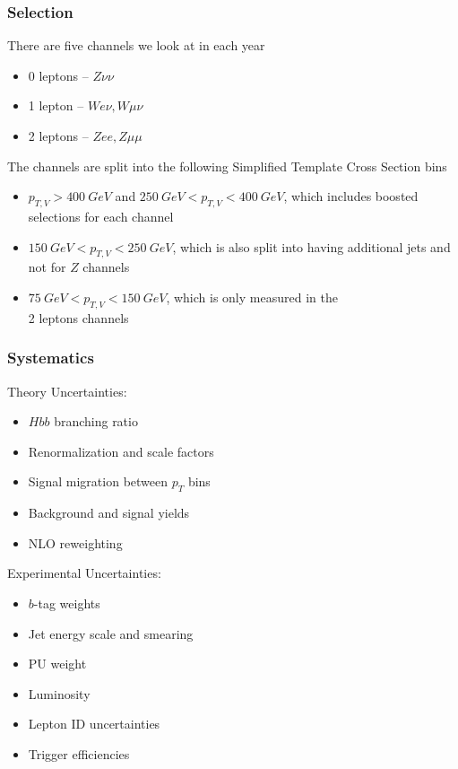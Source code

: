 \documentclass{beamer}
\begin{document}
\begin{frame}
  \frametitle{Selection}

  There are five channels we look at in each year
  \begin{itemize}
  \item 0 leptons -- $Z\nu\nu$
  \item 1 lepton -- $We\nu, W\mu\nu$
  \item 2 leptons -- $Zee, Z\mu\mu$
  \end{itemize}
  The channels are split into the following Simplified Template Cross Section bins
  \begin{itemize}
  \item $p_{T,V} > \SI{400}{GeV}$ and $\SI{250}{GeV} < p_{T,V} < \SI{400}{GeV}$,
    which includes boosted selections for each channel
  \item $\SI{150}{GeV} < p_{T,V} < \SI{250}{GeV}$,
    which is also split into having additional jets and not for $Z$ channels
  \item $\SI{75}{GeV} < p_{T,V} < \SI{150}{GeV}$,
    which is only measured in the \\ 2 leptons channels
  \end{itemize}

\end{frame}

\begin{frame}
  \frametitle{Systematics}

  Theory Uncertainties:
  \begin{itemize}
  \item $Hbb$ branching ratio
  \item Renormalization and scale factors
  \item Signal migration between $p_T$ bins
  \item Background and signal yields
  \item NLO reweighting
  \end{itemize}

  Experimental Uncertainties:
  \begin{itemize}
  \item $b$-tag weights
  \item Jet energy scale and smearing
  \item PU weight
  \item Luminosity
  \item Lepton ID uncertainties
  \item Trigger efficiencies
  \end{itemize}

\end{frame}
\end{document}
